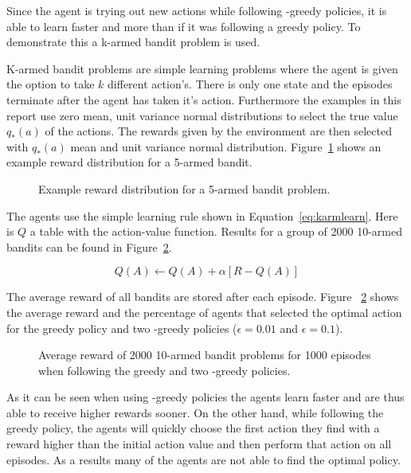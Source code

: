 Since the agent is trying out new actions while following \eps-greedy policies, it is able to learn faster and more than if it was following a greedy policy. To demonstrate this a k-armed bandit problem is used. 

K-armed bandit problems are simple learning problems where the agent is given the option to take $k$ different action's. There is only one state and the episodes terminate after the agent has taken it's action. Furthermore the examples in this report use zero mean, unit variance normal distributions to select the true value $q_*(a)$ of the actions. The rewards given by the environment are then selected with $q_*(a)$ mean and unit variance normal distribution. Figure~\ref{fig:k_armed_bandit_vionlin} shows an example reward distribution for a 5-armed bandit.

\begin{figure}[ht]			
	\centering
			
	\caption{Example reward distribution for a 5-armed bandit problem.}
	\label{fig:k_armed_bandit_vionlin}
\end{figure}

The agents use the simple learning rule shown in Equation~\ref{eq:karmlearn}. Here is $Q$ a table with the action-value function. Results for a group of 2000 10-armed bandits can be found in Figure~\ref{fig:10_armed_bandit}.

\begin{equation}
    Q(A) \leftarrow Q(A) + \alpha \left[ R - Q(A) \right]
    \label{eq:karmlearn}
\end{equation}


The average reward of all bandits are stored after each episode. Figure ~\ref{fig:10_armed_bandit} shows the average reward and the percentage of agents that selected the optimal action for the greedy policy and two \eps-greedy policies ($\epsilon=0.01$ and $\epsilon=0.1$).


\begin{figure}[ht]			
	\centering
				
	\caption{Average reward of 2000 10-armed bandit problems for 1000 episodes when following the greedy and two \eps-greedy policies.}
	\label{fig:10_armed_bandit}
\end{figure}

As it can be seen when using \eps-greedy policies the agents learn faster and are thus able to receive higher rewards sooner. On the other hand, while following the greedy policy, the agents will quickly choose the first action they find with a reward higher than the initial action value and then perform that action on all episodes. As a results many of the agents are not able to find the optimal policy.

